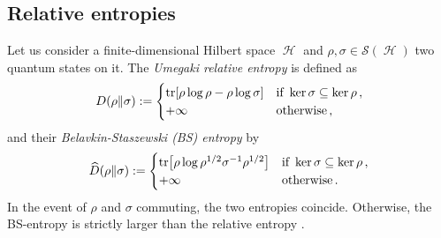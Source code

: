 \documentclass[11pt]{article}
\theoremstyle{newdefinition}
\theoremstyle{newplain}
\theoremstyle{myplain}
\DeclareMathOperator{\HH}{\mathcal{H}}
\DeclareMathOperator{\1}{\mathds{1}}
\begin{document}
\subsection{Relative entropies}

Let us consider a finite-dimensional Hilbert space $\HH$ and $ \rho, \sigma \in \mathcal{S}(\HH)$ two quantum states on it. The \textit{Umegaki relative entropy}
\cite{Umegaki-RelativeEntropy-1962} is defined as 
\begin{equation}\label{eq:eq_relative_entropy}
    D(\rho \Vert \sigma) := \begin{cases}
        \tr[\rho \log\rho - \rho \log \sigma] & \text{if } \ker \sigma \subseteq \ker \rho \, ,\\
        + \infty & \text{otherwise} \, ,
    \end{cases}
\end{equation}
and their \textit{Belavkin-Staszewski (BS) entropy} \cite{BelavkinStaszewski-BSentropy-1982} by 
\begin{equation}
    \widehat{D}(\rho \Vert \sigma) := \begin{cases}
        \tr[\rho\log \rho^{1/2} \sigma^{-1} \rho^{1/2}] & \text{if } \ker \sigma \subseteq \ker \rho \, , \\
        + \infty & \text{otherwise} \, .
    \end{cases}
\end{equation}
In the event of $\rho$ and $\sigma$ commuting, the two entropies coincide.  Otherwise, the BS-entropy is strictly larger than the relative entropy \cite{HiaiMosonyi-f-divergences-2017}.
\end{document}
